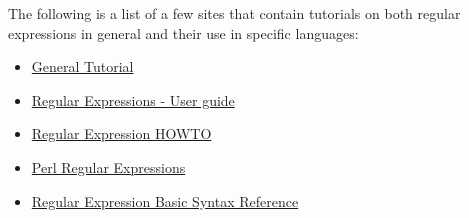 The following is a list of a few sites that contain tutorials on both regular
expressions in general and their use in specific languages:

\begin{itemize}
  \item \href{http://www.regular-expressions.info/}{General Tutorial}
  \item \href{http://www.zytrax.com/tech/web/regex.htm}{Regular Expressions - User guide}
  \item \href{http://docs.python.org/2/howto/regex.html}{Regular Expression HOWTO}
  \item \href{http://www.troubleshooters.com/codecorn/littperl/perlreg.htm}{Perl Regular Expressions}
  \item \href{http://www.regular-expressions.info/reference.html}{Regular Expression Basic Syntax Reference}
\end{itemize}
